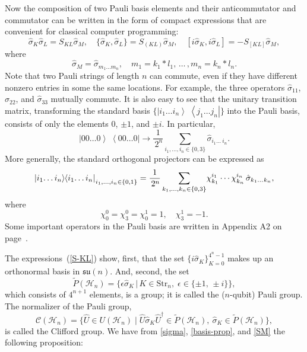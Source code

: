\documentclass[12pt,a4paper,twoside]{article}      %
\newcommand{\ketbra}[2]{{\ensuremath {\left|#1\right\rangle\!\;\!\!\left\langle#2\right|}}}
\begin{document}
Now the composition of two Pauli basis elements and their anticommutator and commutator can be written in the form of compact expressions that are convenient for classical computer programming:
\begin{equation}\label{S-KL}
\hat{\sigma}_K\hat{\sigma}_L= S_{K\!L}\hat{\sigma}_M,
\quad
\{\hat{\sigma}_K,\hat{\sigma}_L\}= S_{(K\!L)}\hat{\sigma}_M,
\quad
[i\hat{\sigma}_K,i\hat{\sigma}_L]= -S_{[K\!L]}\hat{\sigma}_M,
\end{equation}
where
\begin{equation}\label{SM}
\hat{\sigma}_M=\hat{\sigma}_{m_1\ldots{}m_n}, \quad m_1=k_1\!\ast{}\!l_1,\,\ldots\,,m_n=k_n\!\ast{}\!l_n.
\end{equation}
Note that two Pauli strings of length $n$ can commute, even if they have different nonzero entries in some the same locations. For example, the three operators $\hat{\sigma}_{11}$, $\hat{\sigma}_{22}$, and $\hat{\sigma}_{33}$ mutually commute. It is also easy to see that the unitary transition matrix, transforming the standard basis $\big\{\ketbra{i_1\ldots{}i_n}{j_1\ldots{}j_n}\big\}$ into the Pauli basis, consists of only the elements $0$, $\pm1$, and $\pm{i}$. In particular,
\begin{equation}\label{}
\ketbra{00\ldots{}0}{00\ldots{}0}\rightarrow \frac{1}{\,2^n} \sum\limits_{i_1,\ldots,i_n\in\{0,3\}} \hat{\sigma}_{i_1\ldots\:\!i_n}.
\nonumber
\end{equation}
More generally, the standard orthogonal projectors can be expressed as
\begin{equation}\label{}
\ketbra{i_1\!\ldots{}i_n}{i_1\!\ldots{}i_n} _{\:\!\vphantom{\int}i_1,\ldots{},i_n\in\{0,1\}}= \frac{1}{\,2^n} \sum\limits_{k_1,\ldots,k_n\in\{0,3\}}\! \chi^{i_1}_{k_1}\cdots \chi^{i_n}_{k_n}\, \hat{\sigma}_{k_1\ldots\:\!k_n},
\nonumber
\end{equation}
where
\begin{equation}\label{}
\chi^0_0= \chi^0_3= \chi^1_0= 1, \quad \chi^1_3= -1.
\nonumber
\end{equation}
Some important operators in the Pauli basis are written in Appendix A2 on page~\pageref{A2}.

The expressions~(\ref{S-KL}) show, first, that the set $\{i\hat{\sigma}_K\}_{K=0}^{4^n-1}$ makes up an orthonormal basis in $\mathfrak{su}(n)$. And, second, the set
\begin{equation}\label{}
\widetilde{P}(\mathcal{H}_n)= \big\{\epsilon\hat{\sigma}_K \,|\,  K\in\mathrm{Str}_n,\; \epsilon\in\{\pm1,\,\pm{}i\}\big\},
\nonumber
\end{equation}
which consists of $4^{n+1}$ elements, is a group; it is called the ($n$-qubit) Pauli group. The normalizer of the Pauli group,
\begin{equation}\label{}
\mathcal{C}(\mathcal{H}_n)= \big\{\hat{U}\in U(\mathcal{H}_n)\;|\; \hat{U}\hat{\sigma}_K\hat{U}^\dag\in \widetilde{P}(\mathcal{H}_n),\: \hat{\sigma}_K\in\widetilde{P}(\mathcal{H}_n)\big\},
\nonumber
\end{equation}
is called the Clifford group. We have from \ref{sigma}, \ref{basis-prop}, and \ref{SM} the following proposition:
\end{document}

